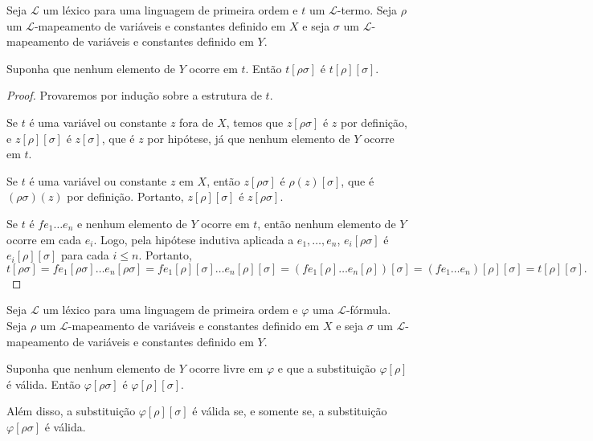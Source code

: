\begin{metalemma}\label{mlem:substituicaoCompostaTermos}
    Seja $\mathcal L$ um léxico para uma linguagem de primeira ordem e $t$ um $\mathcal L$-termo.
    Seja $\rho$ um $\mathcal L$-mapeamento de variáveis e constantes definido em $X$ e seja $\sigma$ um $\mathcal L$-mapeamento de variáveis e constantes definido em $Y$.

    Suponha que nenhum elemento de $Y$ ocorre em $t$.
    Então $t[\rho\sigma]$ é $t[\rho][\sigma]$.
\end{metalemma}

\begin{proof}
    Provaremos por indução sobre a estrutura de $t$.

    Se $t$ é uma variável ou constante $z$ fora de $X$, temos que $z[\rho\sigma]$ é $z$ por definição, e $z[\rho][\sigma]$ é $z[\sigma]$, que é $z$ por hipótese, já que nenhum elemento de $Y$ ocorre em $t$.

    Se $t$ é uma variável ou constante $z$ em $X$, então $z[\rho\sigma]$ é $\rho(z)[\sigma]$, que é $(\rho\sigma)(z)$ por definição.
    Portanto, $z[\rho][\sigma]$ é $z[\rho\sigma]$.

    Se $t$ é $fe_1\dots e_n$ e nenhum elemento de $Y$ ocorre em $t$, então nenhum elemento de $Y$ ocorre em cada $e_i$.
     Logo, pela hipótese indutiva aplicada a $e_1,\dots,e_n$, $e_i[\rho\sigma]$ é $e_i[\rho][\sigma]$ para cada $i\leq n$.
     Portanto,
    \[
        t[\rho\sigma]
        =
        fe_1[\rho\sigma]\dots e_n[\rho\sigma]
        =
        fe_1[\rho][\sigma]\dots e_n[\rho][\sigma]
        =(fe_1[\rho]\dots e_n[\rho])[\sigma]
        =(fe_1\dots e_n)[\rho][\sigma]
        =t[\rho][\sigma].
    \]
\end{proof}

\begin{metalemma}\label{mlem:substituicaoComposta}
    Seja $\mathcal L$ um léxico para uma linguagem de primeira ordem e $\varphi$ uma $\mathcal L$-fórmula.
    Seja $\rho$ um $\mathcal L$-mapeamento de variáveis e constantes definido em $X$ e seja $\sigma$ um $\mathcal L$-mapeamento de variáveis e constantes definido em $Y$.

    Suponha que nenhum elemento de $Y$ ocorre livre em $\varphi$ e que a substituição $\varphi[\rho]$ é válida.
    Então $\varphi[\rho\sigma]$ é $\varphi[\rho][\sigma]$.

    Além disso, a substituição $\varphi[\rho][\sigma]$ é válida se, e somente se, a substituição $\varphi[\rho\sigma]$ é válida.
\end{metalemma}

